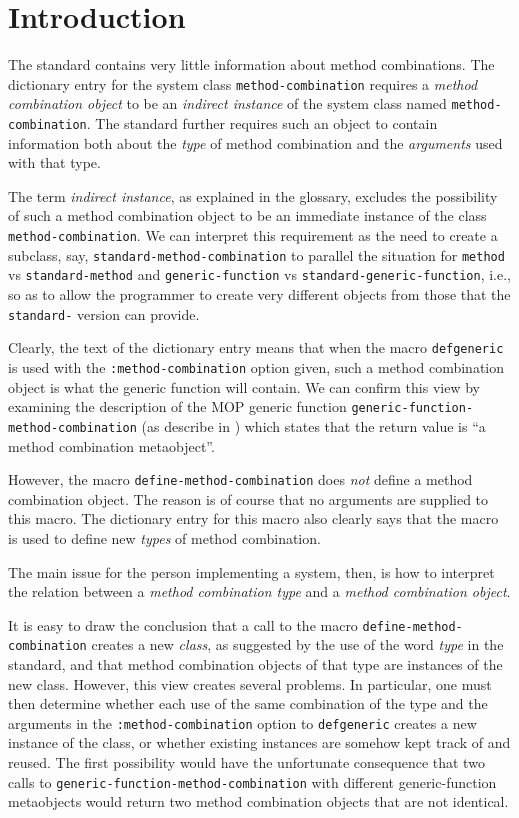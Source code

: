 \section{Introduction}
\label{sec-introduction}

The \commonlisp{} standard \cite{ansi:common:lisp} contains very
little information about method combinations.  The dictionary entry
for the system class \texttt{method-combination} requires a
\emph{method combination object} to be an \emph{indirect instance} of
the system class named \texttt{method-combination}.  The standard
further requires such an object to contain information both about the
\emph{type} of method combination and the \emph{arguments} used with
that type.

The term \emph{indirect instance}, as explained in the glossary,
excludes the possibility of such a method combination object to be an
immediate instance of the class \texttt{method-combination}.  We can
interpret this requirement as the need to create a subclass, say,
\texttt{standard-method-combination} to parallel the situation for
\texttt{method} vs \texttt{standard-method} and
\texttt{generic-function} vs \texttt{standard-generic-function}, i.e.,
so as to allow the programmer to create very different objects from
those that the \texttt{standard-} version can provide.

Clearly, the text of the dictionary entry means that when the macro
\texttt{defgeneric} is used with the \texttt{:method-combination}
option given, such a method combination object is what the generic
function will contain.  We can confirm this view by examining the
description of the MOP generic function
\texttt{generic-function-method-combination} (as describe in
\cite{Kiczales:1991:AMP:574212}) which states that the return value is
``a method combination metaobject''.

However, the macro \texttt{define-method-combination} does \emph{not}
define a method combination object.  The reason is of course that no
arguments are supplied to this macro.  The dictionary entry for this
macro also clearly says that the macro is used to define new
\emph{types} of method combination.

The main issue for the person implementing a \commonlisp{} system,
then, is how to interpret the relation between a \emph{method
  combination type} and a \emph{method combination object}.

It is easy to draw the conclusion that a call to the macro
\texttt{define-method-combination} creates a new \emph{class}, as
suggested by the use of the word \emph{type} in the standard, and that
method combination objects of that type are instances of the new
class.  However, this view creates several problems.  In particular,
one must then determine whether each use of the same combination of
the type and the arguments in the \texttt{:method-combination} option
to \texttt{defgeneric} creates a new instance of the class, or whether
existing instances are somehow kept track of and reused.  The first
possibility would have the unfortunate consequence that two calls to
\texttt{generic-function-method-combination} with different
generic-function metaobjects would return two method combination
objects that are not identical.

